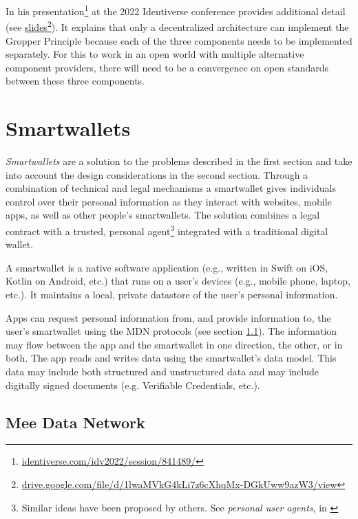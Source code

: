 \documentclass[11pt, oneside]{article}   	%
\newcommand{\hyperfootnote}[1][]{\def\ArgI{{#1}}\hyperfootnoteRelay}
\newcommand\hyperfootnoteRelay[2][]{\href{#1#2}{\ArgI}\footnote{\href{#1#2}{#2}}}
\begin{document}
In his presentation\hyperfootnote[][https://]{identiverse.com/idv2022/session/841489/} at the 2022 Identiverse conference provides additional detail (see \hyperfootnote[slides][https://]{drive.google.com/file/d/1lwaMVkG4kLi7z6cXhqMx-DGkUww9azW3/view}). It explains that only a decentralized architecture can implement the Gropper Principle because each of the three components needs to be implemented separately. For this to work in an open world with multiple alternative component providers, there will need to be a convergence on open standards between these three components. 

\section{Smartwallets} %

 \emph{Smartwallets} are a solution to the problems described in the first section and take into account the design considerations in the second section. Through a combination of technical and legal mechanisms a smartwallet gives individuals control over their personal information as they interact with websites, mobile apps, as well as other people's smartwallets. The solution combines a legal contract with a trusted, personal agent\footnote{Similar ideas have been proposed by others. See \emph{personal user agents}, in \cite[p24]{Flanagan2020}} integrated with a traditional digital wallet\cite{Graham2023}.

A smartwallet is a native software application (e.g., written in Swift on iOS, Kotlin on Android, etc.) that runs on a user's devices (e.g., mobile phone, laptop, etc.). It maintains a local, private datastore of the user's personal information. 

Apps can request personal information from, and provide information to, the user's smartwallet using the MDN protocols (see section \ref{sec:MDN}). The information may flow between the app and the smartwallet in one direction, the other, or in both. The app reads and writes data using the smartwallet's data model. This data may include both structured and unstructured data and may include digitally signed documents (e.g. Verifiable Credentials, etc.). 

\subsection{Mee Data Network}\label{sec:MDN}
\end{document}
